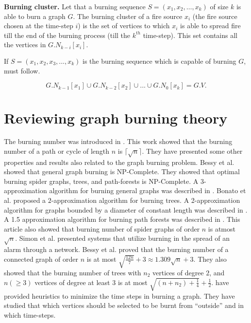 \begin{definition}\label{definition:burning-cluster}
\textbf{Burning cluster.} Let that a burning sequence $S=(x_1,x_2,\dots,x_k)$ of size $k$ is able to burn a graph $G$. The burning cluster of a fire source $x_i$ (the fire source chosen at the time-step $i$) is the set of vertices to which $x_i$ is able to spread fire till the end of the burning process (till the $k^{th}$ time-step). This set contains all the vertices in $G.N_{k-i}[x_i]$.
\end{definition}

If $S = (x_1, x_2, x_3, . . ., x_k)$ is the burning sequence which is capable of burning $G$,  \cite{Bessy2017} must follow.

\begin{equation}\label{equation:burn-verify}
    G.N_{k-1}[x_1] \cup G.N_{k-2}[x_2] \cup . . . \cup G.N_0[x_k] = G.V.
\end{equation}

\section{Reviewing graph burning theory}\label{section:burning-literature}

The burning number was introduced in \cite{Bonato2016}. This work showed that the burning number of a path or cycle of length $n$ is $\lceil\sqrt{n}\rceil$. They have presented some other properties and results also related to the graph burning problem. Bessy et al. \cite{Bessy2017} showed that general graph burning is NP-Complete. They showed that optimal burning spider graphs, trees, and path-forests is NP-Complete. A 3-approximation algorithm for burning general graphs was described in \cite{Bessy2017}. Bonato et al. \cite{Bonato2019} proposed a $2$-approximation algorithm for burning trees. A 2-approximation algorithm for graphs bounded by a diameter of constant length was described in \cite{Kamali2019,Kamali2020}. A 1.5 approximation algorithm for burning path forests was described in \cite{Bonato2019a}. This article also showed that burning number of spider graphs of order $n$ is atmost $\sqrt{n}$. Simon et al. \cite{Simon2019} presented systems that utilize burning in the spread of an alarm through a network.
Bessy et al. \cite{Bessy2018} proved that the burning number of a connected graph of order $n$ is at most $\sqrt{\frac{12n}{7}}+3 \approx 1.309\sqrt{n}+3$. They also showed that the burning number of trees with $n_2$ vertices of degree $2$, and $n (\geq3)$ vertices of degree at least $3$ is at most $\sqrt{(n+n_2)+\frac{1}{4}}+\frac{1}{2}$. \cite{Simon2019a} have provided heuristics to minimize the time steps in burning a graph. They have studied that which vertices should be selected to be burnt from ``outside'' and in which time-steps.

